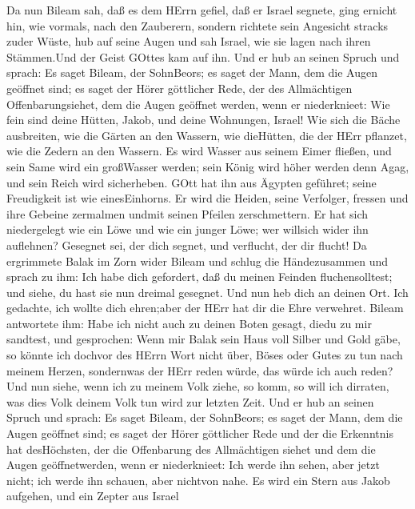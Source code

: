  Da nun Bileam sah, daß es dem HErrn gefiel, daß er Israel
segnete, ging ernicht hin, wie vormals, nach den Zauberern, sondern
richtete sein Angesicht stracks zuder Wüste,  hub auf seine
Augen und sah Israel, wie sie lagen nach ihren Stämmen.Und der Geist
GOttes kam auf ihn.  Und er hub an seinen Spruch und sprach:
Es saget Bileam, der SohnBeors; es saget der Mann, dem die Augen
geöffnet sind;  es saget der Hörer göttlicher Rede, der des
Allmächtigen Offenbarungsiehet, dem die Augen geöffnet werden, wenn er
niederknieet:  Wie fein sind deine Hütten, Jakob, und deine
Wohnungen, Israel!  Wie sich die Bäche ausbreiten, wie die
Gärten an den Wassern, wie dieHütten, die der HErr pflanzet, wie die
Zedern an den Wassern.  Es wird Wasser aus seinem Eimer
fließen, und sein Same wird ein großWasser werden; sein König wird höher
werden denn Agag, und sein Reich wird sicherheben.  GOtt hat
ihn aus Ägypten geführet; seine Freudigkeit ist wie einesEinhorns. Er
wird die Heiden, seine Verfolger, fressen und ihre Gebeine zermalmen
undmit seinen Pfeilen zerschmettern.  Er hat sich
niedergelegt wie ein Löwe und wie ein junger Löwe; wer willsich wider
ihn auflehnen? Gesegnet sei, der dich segnet, und verflucht, der dir
flucht!  Da ergrimmete Balak im Zorn wider Bileam und
schlug die Händezusammen und sprach zu ihm: Ich habe dich gefordert, daß
du meinen Feinden fluchensolltest; und siehe, du hast sie nun dreimal
gesegnet.  Und nun heb dich an deinen Ort. Ich gedachte,
ich wollte dich ehren;aber der HErr hat dir die Ehre verwehret.
 Bileam antwortete ihm: Habe ich nicht auch zu deinen Boten
gesagt, diedu zu mir sandtest, und gesprochen:  Wenn mir
Balak sein Haus voll Silber und Gold gäbe, so könnte ich dochvor des
HErrn Wort nicht über, Böses oder Gutes zu tun nach meinem Herzen,
sondernwas der HErr reden würde, das würde ich auch reden? 
Und nun siehe, wenn ich zu meinem Volk ziehe, so komm, so will ich
dirraten, was dies Volk deinem Volk tun wird zur letzten Zeit.
 Und er hub an seinen Spruch und sprach: Es saget Bileam,
der SohnBeors; es saget der Mann, dem die Augen geöffnet sind;
 es saget der Hörer göttlicher Rede und der die Erkenntnis
hat desHöchsten, der die Offenbarung des Allmächtigen siehet und dem die
Augen geöffnetwerden, wenn er niederknieet:  Ich werde ihn
sehen, aber jetzt nicht; ich werde ihn schauen, aber nichtvon nahe. Es
wird ein Stern aus Jakob aufgehen, und ein Zepter aus Israel
